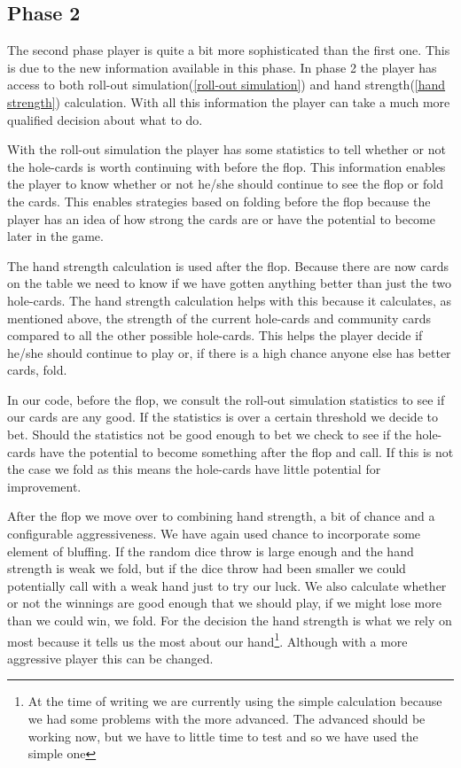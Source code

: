 \documentclass[titlepage, a4paper]{article}
\begin{document}
\subsection{Phase 2}\label{phase 2 player}
The second phase player is quite a bit more sophisticated than the first one. This
is due to the new information available in this phase. In phase 2 the player has
access to both roll-out simulation(\ref{roll-out simulation}) and hand 
strength(\ref{hand strength}) calculation. With all this information the player
can take a much more qualified decision about what to do. 

With the roll-out simulation
the player has some statistics to tell whether or not the hole-cards is worth
continuing with before the flop. This information enables the player to know
whether or not he/she should continue to see the flop or fold the cards. This
enables strategies based on folding before the flop because the player has
an idea of how strong the cards are or have the potential to become later
in the game. 

The hand strength calculation is used after the flop. Because there are now cards
on the table we need to know if we have gotten anything better than just the two
hole-cards. The hand strength calculation helps with this because it calculates,
as mentioned above, the strength of the current hole-cards and community cards
compared to all the other possible hole-cards. This helps the player decide if
he/she should continue to play or, if there is a high chance anyone else has better
cards, fold.

In our code, before the flop, we consult the roll-out simulation statistics to see
if our cards are any good. If the statistics is over a certain threshold we decide
to bet. Should the statistics not be good enough to bet we check to see if the
hole-cards have the potential to become something after the flop and call. If this
is not the case we fold as this means the hole-cards have little potential for improvement.

After the flop we move over to combining hand strength, a bit of chance and a
configurable aggressiveness. We have again used chance to incorporate some element
of bluffing. If the random dice throw is large enough and the hand strength is weak
we fold, but if the dice throw had been smaller we could potentially call with a weak
hand just to try our luck. We also calculate whether or not the winnings are good
enough that we should play, if we might lose more than we could win, we fold.
For the decision the hand strength is what we rely on most because it tells us the
most about our hand\footnote{At the time of writing we are currently using the
	simple calculation because we had some problems with the more advanced.
	The advanced should be working now, but we have to little time to test
and so we have used the simple one}. Although with a more aggressive player this
can be changed.
\end{document}

